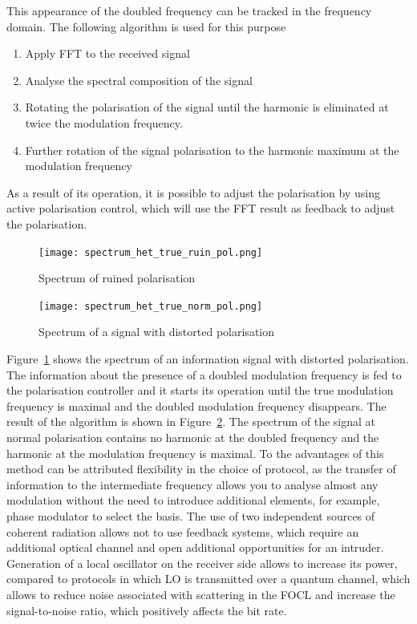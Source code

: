 This appearance of the doubled frequency can be tracked in the frequency domain. The following algorithm is used for this purpose 
\begin{enumerate}
    \item Apply FFT to the received signal
    \item Analyse the spectral composition of the signal
    \item Rotating the polarisation of the signal until the harmonic is eliminated at twice the modulation frequency.
    \item Further rotation of the signal polarisation to the harmonic maximum at the modulation frequency
\end{enumerate}
As a result of its operation, it is possible to adjust the polarisation by using active polarisation control, which will use the FFT result as feedback to adjust the polarisation. 
\begin{figure}
    \centering
    \texttt{[image: spectrum\_het\_true\_ruin\_pol.png]}
    \caption{Spectrum of ruined polarisation}
    \label{fig:ruined pol syn}
\end{figure}
\begin{figure}
    \centering
    \texttt{[image: spectrum\_het\_true\_norm\_pol.png]}
    \caption{Spectrum of a signal with distorted polarisation}
    \label{fig:norm pol syn}
\end{figure}
Figure~\ref{fig:ruined pol syn} shows the spectrum of an information signal with distorted polarisation. The information about the presence of a doubled modulation frequency is fed to the polarisation controller and it starts its operation until the true modulation frequency is maximal and the doubled modulation frequency disappears. The result of the algorithm is shown in Figure~\ref{fig:norm pol syn}. The spectrum of the signal at normal polarisation contains no harmonic at the doubled frequency and the harmonic at the modulation frequency is maximal.
\newline To the advantages of this method can be attributed flexibility in the choice of protocol, as the transfer of information to the intermediate frequency allows you to analyse almost any modulation without the need to introduce additional elements, for example, phase modulator to select the basis. The use of two independent sources of coherent radiation allows not to use feedback systems, which require an additional optical channel and open additional opportunities for an intruder. Generation of a local oscillator on the receiver side allows to increase its power, compared to protocols in which LO is transmitted over a quantum channel, which allows to reduce noise associated with scattering in the FOCL and increase the signal-to-noise ratio, which positively affects the bit rate.

